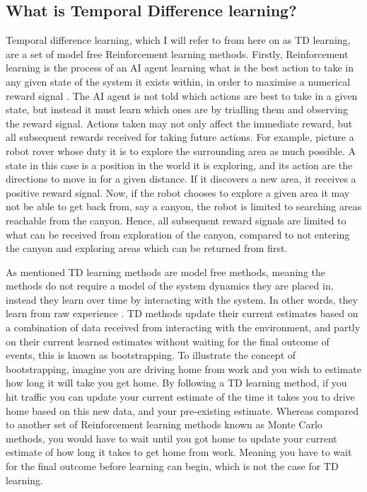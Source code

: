 \documentclass[ %
                    author={Callum Pearce},
                supervisor={Dr. Neill Campbell},
                    degree={MEng},
                     title={How effective are Temporal difference learning methods for reducing the number of zero contribution light paths while still accurately approximating Global Illumination in Path tracing?},
                  subtitle={},
                      type={research},
                      year={2019} ]{dissertation}
\begin{document}
\subsection{What is Temporal Difference learning?}
Temporal difference learning, which I will refer to from 
here on as TD learning, are a set of model free Reinforcement learning methods. 
Firstly, Reinforcement learning is the process of an AI agent learning what is the 
best action to take in any given state of the system it exists within, in order to 
maximise a numerical reward signal \cite{sutton2011reinforcement}.
The AI agent is not told which actions are  best to take in a given state, but
 instead it must learn which ones are by trialling them and observing the reward 
signal. Actions taken may not only affect the immediate 
reward, but all subsequent rewards received for taking future actions. For 
example, picture a robot rover whose duty it is to explore the surrounding area 
as much possible. A state in this case is a position in the world it is exploring, 
and its action are the directions to move in for a given distance. If it discovers 
a new area, it receives a positive reward signal. Now, if the robot chooses to 
explore a given area it may not be able to get back from, say a canyon, the 
robot is limited to searching areas reachable from the canyon. Hence, all 
subsequent reward signals are limited to what can be received from exploration 
of the canyon, compared to not entering the canyon and exploring areas which 
can be returned from first.

As mentioned TD learning methods are model free methods, meaning the methods 
do not require a model of the system dynamics they are placed in, instead they
 learn over time by interacting with the system. In other words, they learn from 
 raw experience  \cite{sutton2011reinforcement}. TD methods update their current
estimates based on a combination of data received from interacting with the 
environment, and partly on their current learned estimates without waiting for the 
final outcome of events, this is known as bootstrapping. To illustrate the concept 
of bootstrapping, imagine you are driving home from work and you wish to estimate 
how long it will take you get home. By following a TD learning method, if you hit 
traffic you can update your current estimate of the time it takes you to drive home
based on this new data, and your pre-existing estimate. Whereas compared to 
another set of Reinforcement learning methods known as Monte Carlo methods, 
you would have to wait until you got home to update your current estimate of how 
long it takes to get home from work. Meaning you have to wait for the final outcome
before learning can begin, which is not the case for TD learning.
\end{document}

